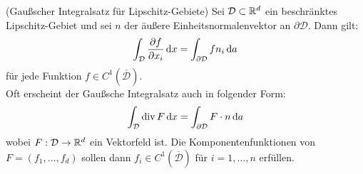 %	


\begin{Satz} (Gaußscher Integralsatz für Lipschitz-Gebiete) \newline
 	Sei $\mathcal{D}  \subset \mathbb{R}^d$ ein beschränktes Lipschitz-Gebiet und sei $n$ der äußere Einheitsnormalenvektor an $\partial \mathcal{D}$. Dann gilt:
 		\begin{align*}
	 		\int_{\mathcal{D}} \frac{\partial f}{\partial x_i} \, \mathrm{d} x  = \int_{\partial \mathcal{D}} f n_i \, \mathrm{d} a
 		\end{align*}
 		für jede Funktion $f \in C^1(\overline{\mathcal{D}})$. \\ 
 		Oft erscheint der Gaußsche Integralsatz auch in folgender Form:
 		\begin{align*}
 		\int_{\mathcal{D}} \operatorname{div} F \, \mathrm{d} x =  \int_{\partial \mathcal{D}} F \cdot n \, \mathrm{d} a
 		\end{align*}
 		wobei $F:\mathcal{D} \to \mathbb{R}^d$ ein Vektorfeld ist. Die Komponentenfunktionen von $F = (f_1,\dots,f_d)$ sollen dann $f_i \in C^1(\overline{\mathcal{D}})$ für $i=1,\dots,n$ erfüllen.
\end{Satz}

